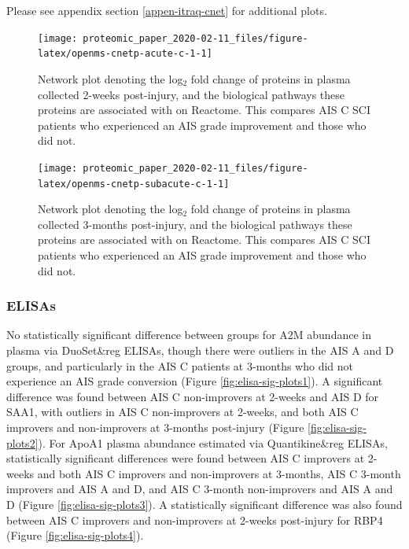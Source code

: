 \documentclass[
]{article}
\begin{document}
Please see appendix section \ref{appen-itraq-cnet} for additional plots.

\begin{SidewaysFigure}



\begin{figure}

{\centering \texttt{[image: proteomic\_paper\_2020-02-11\_files/figure-latex/openms-cnetp-acute-c-1-1]} 

}

\caption{Network plot denoting the log$_2$ fold change of proteins in plasma collected 2-weeks post-injury, and the biological pathways these proteins are associated with on Reactome. This compares AIS C SCI patients who experienced an AIS grade improvement and those who did not.}\label{fig:openms-cnetp-acute-c-1}
\end{figure}

\end{SidewaysFigure}
\begin{SidewaysFigure}



\begin{figure}

{\centering \texttt{[image: proteomic\_paper\_2020-02-11\_files/figure-latex/openms-cnetp-subacute-c-1-1]} 

}

\caption{Network plot denoting the log$_2$ fold change of proteins in plasma collected 3-months post-injury, and the biological pathways these proteins are associated with on Reactome. This compares AIS C SCI patients who experienced an AIS grade improvement and those who did not.}\label{fig:openms-cnetp-subacute-c-1}
\end{figure}

\end{SidewaysFigure}

\clearpage

\hypertarget{elisas}{%
\subsubsection{ELISAs}\label{elisas}}

No statistically significant difference between groups for A2M abundance in plasma via DuoSet\&reg ELISAs, though there were outliers in the AIS A and D groups, and particularly in the AIS C patients at 3-months who did not experience an AIS grade conversion (Figure \ref{fig:elisa-sig-plots1}).
A significant difference was found between AIS C non-improvers at 2-weeks and AIS D for SAA1, with outliers in AIS C non-improvers at 2-weeks, and both AIS C improvers and non-improvers at 3-months post-injury (Figure \ref{fig:elisa-sig-plots2}).
For ApoA1 plasma abundance estimated via Quantikine\&reg ELISAs, statistically significant differences were found between AIS C improvers at 2-weeks and both AIS C improvers and non-improvers at 3-months, AIS C 3-month improvers and AIS A and D, and AIS C 3-month non-improvers and AIS A and D (Figure \ref{fig:elisa-sig-plots3}).
A statistically significant difference was also found between AIS C improvers and non-improvers at 2-weeks post-injury for RBP4 (Figure \ref{fig:elisa-sig-plots4}).
\end{document}
